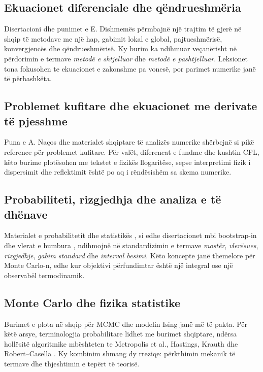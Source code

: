 \subsection{Ekuacionet diferenciale dhe qëndrueshmëria}
Disertacioni dhe punimet e E. Dishmemës \cite{dishmema,dishmemaArticle} përmbajnë një trajtim të gjerë në shqip të metodave me një hap, gabimit lokal e global, pajtueshmërisë, konvergjencës dhe qëndrueshmërisë. Ky burim ka ndihmuar veçanërisht në përdorimin e termave \emph{metodë e shtjelluar} dhe \emph{metodë e pashtjelluar}. Leksionet tona fokusohen te ekuacionet e zakonshme pa vonesë, por parimet numerike janë të përbashkëta.

\subsection{Problemet kufitare dhe ekuacionet me derivate të pjesshme}
Puna e A. Naços \cite{naco} dhe materialet shqiptare të analizës numerike shërbejnë si pikë reference për problemet kufitare. Për valët, diferencat e fundme dhe kushtin CFL, këto burime plotësohen me tekstet e fizikës llogaritëse, sepse interpretimi fizik i dispersimit dhe reflektimit është po aq i rëndësishëm sa skema numerike.

\subsection{Probabiliteti, rizgjedhja dhe analiza e të dhënave}
Materialet e probabilitetit dhe statistikës \cite{capollari}, si edhe disertacionet mbi bootstrap-in dhe vlerat e humbura \cite{butka,tasho}, ndihmojnë në standardizimin e termave \emph{mostër}, \emph{vlerësues}, \emph{rizgjedhje}, \emph{gabim standard} dhe \emph{interval besimi}. Këto koncepte janë themelore për Monte Carlo-n, edhe kur objektivi përfundimtar është një integral ose një observabël termodinamik.

\subsection{Monte Carlo dhe fizika statistike}
Burimet e plota në shqip për MCMC dhe modelin Ising janë më të pakta. Për këtë arsye, terminologjia probabilitare lidhet me burimet shqiptare, ndërsa hollësitë algoritmike mbështeten te Metropolis et al., Hastings, Krauth dhe Robert--Casella \cite{metropolis,hastings,krauth,robert}. Ky kombinim shmang dy rreziqe: përkthimin mekanik të termave dhe thjeshtimin e tepërt të teorisë.

